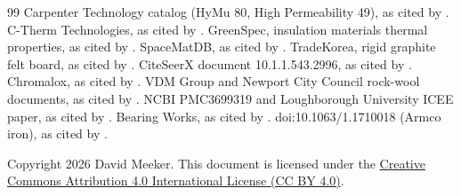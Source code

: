 \documentclass[10pt]{article}
\begin{document}
\begin{thebibliography}{99}
 Carpenter Technology catalog (HyMu 80, High Permeability 49), as cited by \cite{specheat}.
 C-Therm Technologies, as cited by \cite{specheat}.
 GreenSpec, insulation materials thermal properties, as cited by \cite{specheat}.
 SpaceMatDB, as cited by \cite{specheat}.
 TradeKorea, rigid graphite felt board, as cited by \cite{specheat}.
 CiteSeerX document 10.1.1.543.2996, as cited by \cite{specheat}.
 Chromalox, as cited by \cite{specheat}.
 VDM Group and Newport City Council rock-wool documents, as cited by \cite{specheat}.
 NCBI PMC3699319 and Loughborough University ICEE paper, as cited by \cite{specheat}.
 Bearing Works, as cited by \cite{specheat}.
 doi:10.1063/1.1710018 (Armco iron), as cited by \cite{specheat}.
\end{thebibliography}

\noindent Copyright 2026 David Meeker. This document is licensed under the \href{https://creativecommons.org/licenses/by/4.0/}{Creative Commons Attribution 4.0 International License (CC BY 4.0)}.
\end{document}
